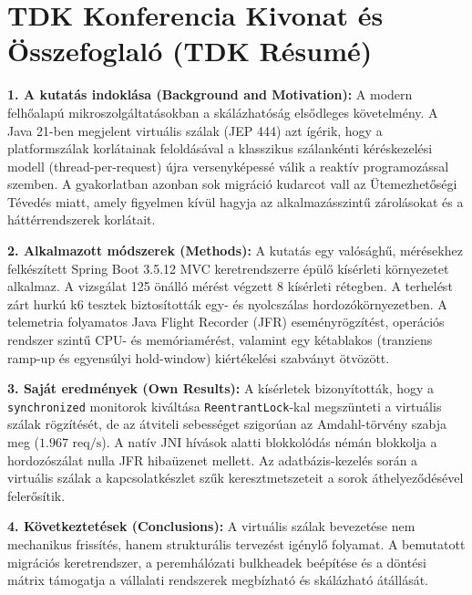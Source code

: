 \section{TDK Konferencia Kivonat és Összefoglaló (TDK Résumé)}
\label{sec:tdk-resume}

\textbf{1. A kutatás indoklása (Background and Motivation):}  
A modern felhőalapú mikroszolgáltatásokban a skálázhatóság elsődleges követelmény. A Java 21-ben megjelent virtuális szálak (JEP 444) azt ígérik, hogy a platformszálak korlátainak feloldásával a klasszikus szálankénti kéréskezelési modell (thread-per-request) újra versenyképessé válik a reaktív programozással szemben. A gyakorlatban azonban sok migráció kudarcot vall az Ütemezhetőségi Tévedés miatt, amely figyelmen kívül hagyja az alkalmazásszintű zárolásokat és a háttérrendszerek korlátait.

\textbf{2. Alkalmazott módszerek (Methods):}  
A kutatás egy valósághű, mérésekhez felkészített Spring Boot 3.5.12 MVC keretrendszerre épülő kísérleti környezetet alkalmaz. A vizsgálat 125 önálló mérést végzett 8 kísérleti rétegben. A terhelést zárt hurkú k6 tesztek biztosították egy- és nyolcszálas hordozókörnyezetben. A telemetria folyamatos Java Flight Recorder (JFR) eseményrögzítést, operációs rendszer szintű CPU- és memóriamérést, valamint egy kétablakos (tranziens ramp-up és egyensúlyi hold-window) kiértékelési szabványt ötvözött.

\textbf{3. Saját eredmények (Own Results):}  
A kísérletek bizonyították, hogy a \texttt{synchronized} monitorok kiváltása \texttt{ReentrantLock}-kal megszünteti a virtuális szálak rögzítését, de az átviteli sebességet szigorúan az Amdahl-törvény szabja meg ($1.967\text{ req/s}$). A natív JNI hívások alatti blokkolódás némán blokkolja a hordozószálat nulla JFR hibaüzenet mellett. Az adatbázis-kezelés során a virtuális szálak a kapcsolatkészlet szűk keresztmetszeteit a sorok áthelyeződésével felerősítik.

\textbf{4. Következtetések (Conclusions):}  
A virtuális szálak bevezetése nem mechanikus frissítés, hanem strukturális tervezést igénylő folyamat. A bemutatott migrációs keretrendszer, a peremhálózati bulkheadek beépítése és a döntési mátrix támogatja a vállalati rendszerek megbízható és skálázható átállását.
